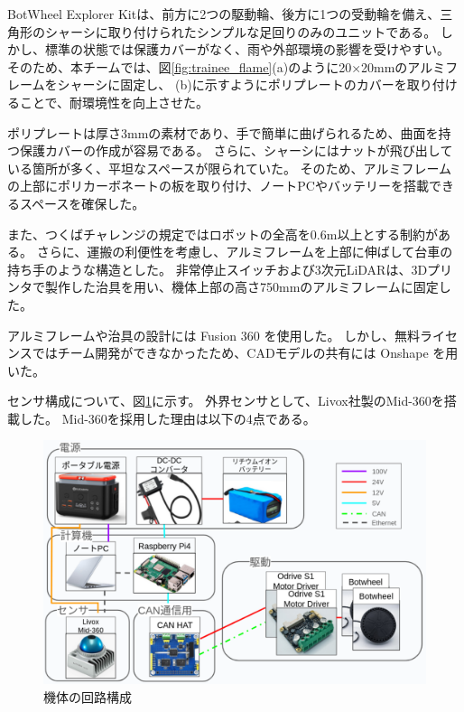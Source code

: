 \documentclass[twocolumn,9pt]{jsproceedings}
\begin{document}
BotWheel Explorer Kitは、前方に2つの駆動輪、後方に1つの受動輪を備え、三角形のシャーシに取り付けられたシンプルな足回りのみのユニットである。
しかし、標準の状態では保護カバーがなく、雨や外部環境の影響を受けやすい。
そのため、本チームでは、図\ref{fig:trainee_flame}(a)のように20×20mmのアルミフレームをシャーシに固定し、
(b)に示すようにポリプレートのカバーを取り付けることで、耐環境性を向上させた\cite{PE960_1}。

ポリプレートは厚さ3mmの素材であり、手で簡単に曲げられるため、曲面を持つ保護カバーの作成が容易である。
さらに、シャーシにはナットが飛び出している箇所が多く、平坦なスペースが限られていた。
そのため、アルミフレームの上部にポリカーボネートの板を取り付け、ノートPCやバッテリーを搭載できるスペースを確保した。

また、つくばチャレンジの規定ではロボットの全高を0.6m以上とする制約がある。
さらに、運搬の利便性を考慮し、アルミフレームを上部に伸ばして台車の持ち手のような構造とした。
非常停止スイッチおよび3次元LiDARは、3Dプリンタで製作した治具を用い、機体上部の高さ750mmのアルミフレームに固定した。

アルミフレームや治具の設計には Fusion 360 \cite{Fusion360} を使用した。
しかし、無料ライセンスではチーム開発ができなかったため、CADモデルの共有には Onshape \cite{Onshape} を用いた。


センサ構成について、図\ref{fig:botwheel-explorer-schematic}に示す。
外界センサとして、Livox社製のMid-360\cite{mid360}を搭載した。
Mid-360を採用した理由は以下の4点である。
\begin{figure}[h]
  \begin{center}
    \includegraphics[width=1.0\linewidth]{figs/botwheel-explorer-schematic.pdf}
    \caption{機体の回路構成}
    \label{fig:botwheel-explorer-schematic}
  \end{center}
\end{figure}
\end{document}
